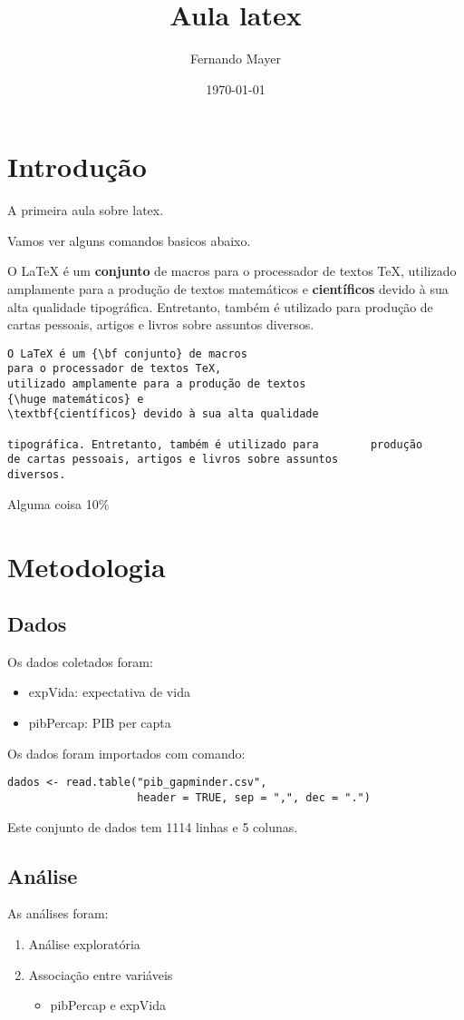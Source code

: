 \documentclass[a4paper,12pt]{article}
\title{Aula latex}
\author{Fernando Mayer}
\date{\today}
\begin{document}
\maketitle
\tableofcontents

\newpage

\section{Introdução}

A primeira aula sobre latex.

Vamos ver alguns comandos basicos abaixo.

O LaTeX é um {\bf conjunto} de macros para o processador de textos TeX, utilizado amplamente para a produção de textos
{\huge matemáticos} e \textbf{científicos} devido à sua alta qualidade
tipográfica. Entretanto, também é utilizado para        produção
de cartas pessoais, artigos e livros sobre assuntos
diversos.

\begin{verbatim}
O LaTeX é um {\bf conjunto} de macros
para o processador de textos TeX, 
utilizado amplamente para a produção de textos
{\huge matemáticos} e 
\textbf{científicos} devido à sua alta qualidade

tipográfica. Entretanto, também é utilizado para        produção
de cartas pessoais, artigos e livros sobre assuntos
diversos.
\end{verbatim}

Alguma coisa 10\%

\section{Metodologia}

\subsection{Dados}

Os dados coletados foram:

\begin{itemize}
\item expVida: expectativa de vida
\item pibPercap: PIB per capta
\end{itemize}

Os dados foram importados com  comando:

\begin{verbatim}
dados <- read.table("pib_gapminder.csv",
                    header = TRUE, sep = ",", dec = ".")
\end{verbatim}

Este conjunto de dados tem 1114 linhas e 5 colunas.

\subsection{Análise}

As análises foram:

\begin{enumerate}
\item Análise exploratória
\item Associação entre variáveis
\begin{itemize}
\item pibPercap e expVida
\end{itemize}
\end{enumerate}
\end{document}
